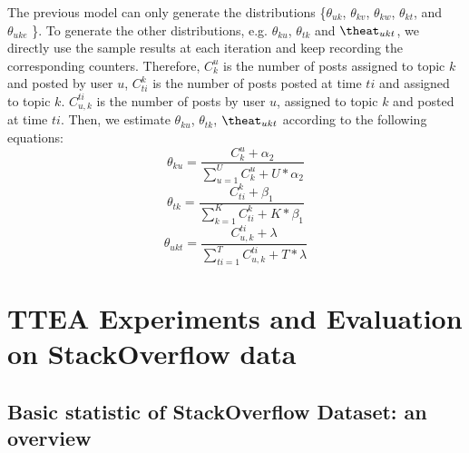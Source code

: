 {{{{{{{The previous model can only generate the distributions \{$\theta_{uk}$, $\theta_{kv}$, $\theta_{kw}$, $\theta_{kt}$, and $\theta_{uke}$ \}. To generate the other distributions, e.g. $\theta_{ku}$, $\theta_{tk}$ and $\theat_{ukt}$, we directly use the sample results at each iteration and keep recording the corresponding counters. Therefore, $C_k^u$ is the number of posts assigned to topic $k$ and posted by user $u$, $C_{ti}^k$ is the number of posts posted at time $ti$ and assigned to topic $k$. $C_{u,k}^{ti}$ is the number of posts by user $u$, assigned to topic $k$ and posted at time $ti$.
Then, we estimate $\theta_{ku}$, $\theta_{tk}$, $\theat_{ukt}$ according to the following equations:
\begin{equation}%
\theta_{ku}=\frac{ C_k^u + \alpha_2 }{ \sum_{u=1}^U C_k^u+ U* \alpha_2} 
\end{equation}
\begin{equation}%
\theta_{tk}=\frac{ C_{ti}^{k} + \beta_1 }{ \sum_{k=1}^{K} C_{ti}^{k}+ K* \beta_1}
\end{equation}
\begin{equation}%
\theta_{ukt}=\frac{ C_{u,k}^{ti} + \lambda }{ \sum_{ti=1}^T C_{u,k}^{ti}+ T* \lambda} 
\end{equation}








\section{TTEA Experiments and Evaluation on StackOverflow data}\label{sec:TTEAexperiment}

\subsection{Basic statistic of StackOverflow Dataset: an overview}

}}}}}}}
